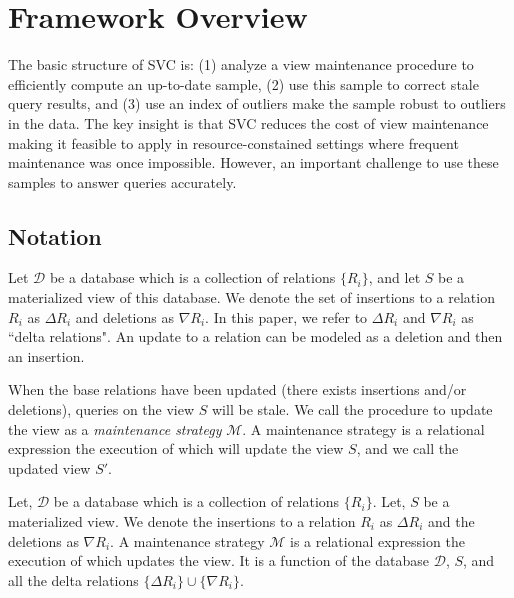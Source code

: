 \section{Framework Overview}\label{sec-arch}
The basic structure of SVC is: (1) analyze a view maintenance procedure to efficiently compute an up-to-date sample, (2) use this sample to correct stale query results, and (3) use an index of outliers make the sample robust to outliers in the data. 
The key insight is that SVC reduces the cost of view maintenance making it feasible to apply in resource-constained settings where frequent maintenance was once impossible.
However, an important challenge to use these samples to answer queries accurately.

\subsection{Notation}
Let $\mathcal{D}$ be a database which is a collection of relations $\{R_i\}$, and let $S$ be a materialized view of this database.
We denote the set of insertions to a relation $R_i$ as $\Delta R_i$ and deletions as $\nabla R_i$.
In this paper, we refer to $\Delta R_i$ and $\nabla R_i$ as ``delta relations".
An update to a relation can be modeled as a deletion and then an insertion.

When the base relations have been updated (there exists insertions and/or deletions), queries on the view $S$ will be stale.
We call the procedure to update the view as a \emph{maintenance strategy} $\mathcal{M}$.
A maintenance strategy is a relational expression the execution of which will update the view $S$, and we call the updated view $S'$.

\begin{definition}
Let, $\mathcal{D}$ be a database which is a collection of relations $\{R_i\}$.
Let, $S$ be a materialized view.
We denote the insertions to a relation $R_i$ as $\Delta R_i$ and the deletions as $\nabla R_i$.
A maintenance strategy $\mathcal{M}$ is a relational expression the execution of which updates the view.
It is a function of the database $\mathcal{D}$, $S$, and all the delta relations $\{\Delta R_i\} \cup \{\nabla R_i\}$.
\end{definition}

